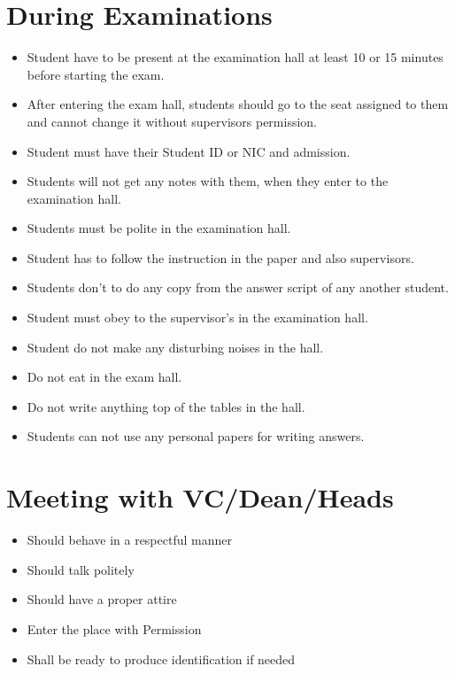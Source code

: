 \documentclass[12pt,a4paper]{article}
\begin{document}
\section{During Examinations}
\begin{itemize}
\item Student have to be present at the examination hall at least 10 or 15 minutes before starting the exam.
\item After entering the exam hall, students should go to the seat assigned to them and cannot change it without supervisors permission.
\item Student must have their Student ID or NIC and admission.
\item Students will not get any notes with them, when they enter to the examination hall.
\item Students must be polite in the examination hall.
\item Student has to follow the instruction in the paper and also supervisors.
\item Students don’t to do any copy from the answer script of any another student.
\item Student must obey to the supervisor’s in the examination hall.
\item Student do not make any disturbing noises in the hall.
\item Do not eat in the exam hall.
\item Do not write anything top of the tables in the hall.
\item Students can not use any personal papers for writing answers.
\end{itemize}

\newpage
\section{Meeting with VC/Dean/Heads}
\begin{itemize}
\item Should behave in a respectful manner
\item Should talk politely
\item Should have a proper attire
\item Enter the place with Permission
\item Shall be ready to produce identification if needed

\end{itemize}

\newpage
\end{document}
